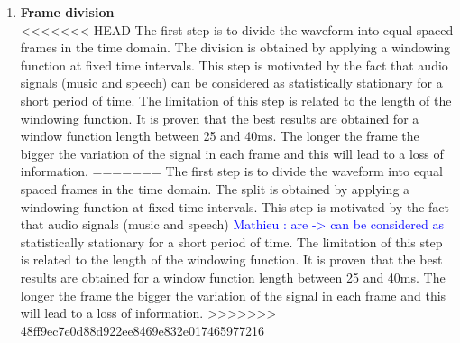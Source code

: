 \documentclass[hidelinks,12pt]{report}
\newcommand{\ml}[1]{\textcolor{blue}{ Mathieu : #1}}
\begin{document}
\begin{enumerate}
\item \textbf{Frame division} \\
<<<<<<< HEAD
The first step is to divide the waveform into equal spaced frames in the time domain. The division is obtained by applying a windowing function at fixed time intervals. This step is motivated by the fact that audio signals (music and speech) can be considered as statistically stationary for a short period of time. The limitation of this step is related to the length of the windowing function. It is proven that the best results are obtained for a window function length between 25 and 40ms. The longer the frame the bigger the variation of the signal in each frame and this will lead to a loss of information. 
=======
The first step is to divide the waveform into equal spaced frames in the time domain. The split is obtained by applying a windowing function at fixed time intervals. This step is motivated by the fact that audio signals (music and speech) \ml{are -> can be considered as} statistically stationary for a short period of time. The limitation of this step is related to the length of the windowing function. It is proven that the best results are obtained for a window function length between 25 and 40ms. The longer the frame the bigger the variation of the signal in each frame and this will lead to a loss of information. 
>>>>>>> 48ff9ec7e0d88d922ee8469e832e017465977216


\end{enumerate}
\end{document}

